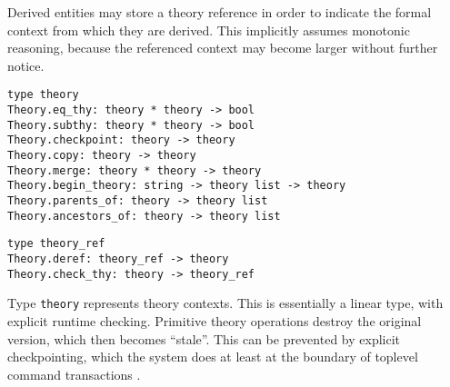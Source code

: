 \begin{isabellebody}
\begin{isamarkuptext}
  Derived entities may store a theory reference in order to indicate
  the formal context from which they are derived.  This implicitly
  assumes monotonic reasoning, because the referenced context may
  become larger without further notice.%
\end{isamarkuptext}%
\isamarkuptrue%
%
\isadelimmlref
%
\endisadelimmlref
%
\isatagmlref
%
\begin{isamarkuptext}%
\begin{mldecls}
  \verb|type theory| \\
  \verb|Theory.eq_thy: theory * theory -> bool| \\
  \verb|Theory.subthy: theory * theory -> bool| \\
  \verb|Theory.checkpoint: theory -> theory| \\
  \verb|Theory.copy: theory -> theory| \\
  \verb|Theory.merge: theory * theory -> theory| \\
  \verb|Theory.begin_theory: string -> theory list -> theory| \\
  \verb|Theory.parents_of: theory -> theory list| \\
  \verb|Theory.ancestors_of: theory -> theory list| \\
  \end{mldecls}
  \begin{mldecls}
  \verb|type theory_ref| \\
  \verb|Theory.deref: theory_ref -> theory| \\
  \verb|Theory.check_thy: theory -> theory_ref| \\
  \end{mldecls}

  \begin{description}

  \item Type \verb|theory| represents theory contexts.  This is
  essentially a linear type, with explicit runtime checking.
  Primitive theory operations destroy the original version, which then
  becomes ``stale''.  This can be prevented by explicit checkpointing,
  which the system does at least at the boundary of toplevel command
  transactions .


\end{description}
\end{isamarkuptext}
\end{isabellebody}
